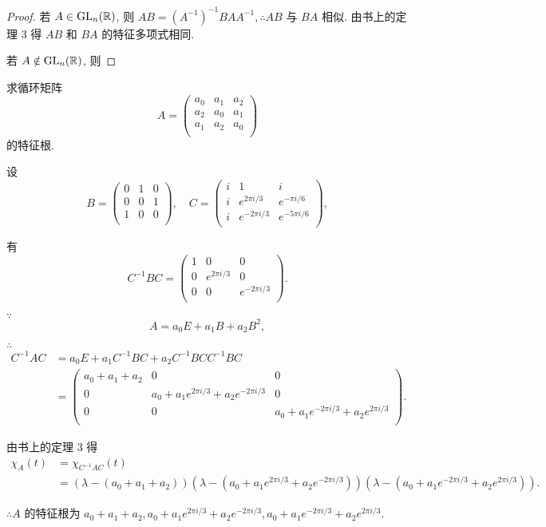 \documentclass[color=black,device=normal,lang=cn,mode=geye]{elegantnote}
\begin{document}
\begin{proof}
    若 $A\in\operatorname{GL} _n(\mathbb{R})$, 则 $AB=(A^{-1})^{-1}BAA^{-1},\therefore AB$ 与 $BA$ 相似. 由书上的定理 3 得 $AB$ 和 $BA$ 的特征多项式相同.

    若 $A\notin\operatorname{GL} _n(\mathbb{R})$, 则 %
\end{proof}
\begin{exercise}%
    求循环矩阵
    \[A=\begin{pmatrix}
        a_0 & a_1 & a_2 \\
        a_2 & a_0 & a_1 \\
        a_1 & a_2 & a_0 \\
    \end{pmatrix}\]
    的特征根.
\end{exercise}
\begin{solution}
    设
    \[B=\begin{pmatrix}
        0 & 1 & 0 \\
        0 & 0 & 1 \\
        1 & 0 & 0 \\
    \end{pmatrix},\quad C=\begin{pmatrix}
        i & 1 & i \\
        i & e^{2\pi i/3} & e^{-\pi i/6} \\
        i & e^{-2\pi i/3} & e^{-5\pi i/6} \\
    \end{pmatrix},\]

    有
    \[C^{-1}BC=\begin{pmatrix}
        1 & 0 & 0 \\
        0 & e^{2\pi i/3} & 0 \\
        0 & 0 & e^{-2\pi i/3} \\
    \end{pmatrix}.\]

    $\because$
    \[A=a_0E+a_1B+a_2B^2,\]

    $\therefore$
    \begin{align*}
        C^{-1}AC & =a_0E+a_1C^{-1}BC+a_2C^{-1}BCC^{-1}BC \\
        & =\begin{pmatrix}
            a_0+a_1+a_2 & 0 & 0 \\
            0 & a_0+a_1e^{2\pi i/3}+a_2e^{-2\pi i/3} & 0 \\
            0 & 0 & a_0+a_1e^{-2\pi i/3}+a_2e^{2\pi i/3} \\
        \end{pmatrix}.
    \end{align*}

    由书上的定理 3 得
    \begin{align*}
        \chi_A(t) & =\chi_{C^{-1}AC}(t) \\
        & =(\lambda-(a_0+a_1+a_2))(\lambda-(a_0+a_1e^{2\pi i/3}+a_2e^{-2\pi i/3}))(\lambda-(a_0+a_1e^{-2\pi i/3}+a_2e^{2\pi i/3})).
    \end{align*}

    $\therefore A$ 的特征根为 $a_0+a_1+a_2,a_0+a_1e^{2\pi i/3}+a_2e^{-2\pi i/3},a_0+a_1e^{-2\pi i/3}+a_2e^{2\pi i/3}$.
\end{solution}
\end{document}
